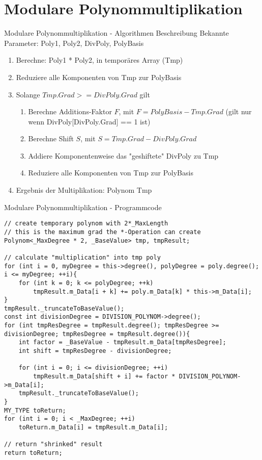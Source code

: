 \documentclass{beamer}
\begin{document}
  \section{Modulare Polynommultiplikation}
    \begin{frame}{Modulare Polynommultiplikation \newline - Algorithmen Beschreibung}
		Bekannte Parameter: Poly1, Poly2, DivPoly, PolyBasis
    	\begin{enumerate}
  	  	\item Berechne: Poly1 * Poly2, in temporäres Array (Tmp)
  	  	\item Reduziere alle Komponenten von Tmp zur PolyBasis
  	  	\item Solange $Tmp.Grad >= DivPoly.Grad$ gilt
  	  	\begin{enumerate}
	  	  	\item Berechne Additions-Faktor $F$, mit $F = PolyBasis - Tmp.Grad$ \newline (gilt nur wenn DivPoly[DivPoly.Grad] == 1 ist)
	  	  	\item Berechne Shift $S$, mit $S = Tmp.Grad - DivPoly.Grad$
	  	  	\item Addiere Komponentenweise das "geshiftete" DivPoly zu Tmp
	  	  	\item Reduziere alle Komponenten von Tmp zur PolyBasis
  	  	\end{enumerate}
  	  	\item Ergebnis der Multiplikation: Polynom Tmp
  	  	\end{enumerate}
    \end{frame}
    
    \begin{frame}[fragile]{Modulare Polynommultiplikation \newline - Programmcode}
    	\begin{lstlisting}[style=numbers]
// create temporary polynom with 2*_MaxLength
// this is the maximum grad the *-Operation can create
Polynom<_MaxDegree * 2, _BaseValue> tmp, tmpResult;

// calculate "multiplication" into tmp poly
for (int i = 0, myDegree = this->degree(), polyDegree = poly.degree(); i <= myDegree; ++i){
    for (int k = 0; k <= polyDegree; ++k)
        tmpResult.m_Data[i + k] += poly.m_Data[k] * this->m_Data[i];
}
tmpResult._truncateToBaseValue();
const int divisionDegree = DIVISION_POLYNOM->degree();
for (int tmpResDegree = tmpResult.degree(); tmpResDegree >= divisionDegree; tmpResDegree = tmpResult.degree()){
    int factor = _BaseValue - tmpResult.m_Data[tmpResDegree];
    int shift = tmpResDegree - divisionDegree;

    for (int i = 0; i <= divisionDegree; ++i)
        tmpResult.m_Data[shift + i] += factor * DIVISION_POLYNOM->m_Data[i];
    tmpResult._truncateToBaseValue();
}
MY_TYPE toReturn;
for (int i = 0; i < _MaxDegree; ++i)
    toReturn.m_Data[i] = tmpResult.m_Data[i];

// return "shrinked" result
return toReturn;
\end{lstlisting}
\end{frame}
\end{document}
